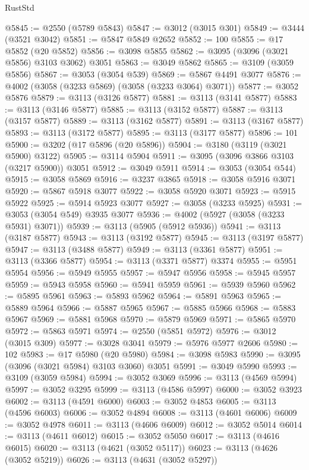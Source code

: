 \begin{lexlean}{RustStd}
\begin{coremodule}
@5845 := @2550 (@5789 @5843)
@5847 := @3012 (@3015 @301)
@5849 := @3444 (@3521 @3042)
@5851 := @5847 @5849 @2652
@5852 := 100
@5855 := @17 @5852 (@20 @5852)
@5856 := @3098 @5855
@5862 := @3095 (@3096 (@3021 @5856) @3103 @3062) @3051
@5863 := @3049 @5862
@5865 := @3109 (@3059 @5856)
@5867 := @3053 (@3054 @539)
@5869 := @5867 @4491 @3077
@5876 := @4002 (@3058 (@3233 @5869) (@3058 (@3233 @3064) @3071))
@5877 := @3052 @5876
@5879 := @3113 (@3126 @5877)
@5881 := @3113 (@3141 @5877)
@5883 := @3113 (@3146 @5877)
@5885 := @3113 (@3152 @5877)
@5887 := @3113 (@3157 @5877)
@5889 := @3113 (@3162 @5877)
@5891 := @3113 (@3167 @5877)
@5893 := @3113 (@3172 @5877)
@5895 := @3113 (@3177 @5877)
@5896 := 101
@5900 := @3202 (@17 @5896 (@20 @5896))
@5904 := @3180 (@3119 (@3021 @5900) @3122)
@5905 := @3114 @5904
@5911 := @3095 (@3096 @3866 @3103 (@3217 @5900)) @3051
@5912 := @3049 @5911
@5914 := @3053 (@3054 @544)
@5915 := @3058 @5869
@5916 := @3237 @3865
@5918 := @3058 @5916 @3071
@5920 := @5867 @5918 @3077
@5922 := @3058 @5920 @3071
@5923 := @5915 @5922
@5925 := @5914 @5923 @3077
@5927 := @3058 (@3233 @5925)
@5931 := @3053 (@3054 @549) @3935 @3077
@5936 := @4002 (@5927 (@3058 (@3233 @5931) @3071))
@5939 := @3113 (@5905 (@5912 @5936))
@5941 := @3113 (@3187 @5877)
@5943 := @3113 (@3192 @5877)
@5945 := @3113 (@3197 @5877)
@5947 := @3113 (@3488 @5877)
@5949 := @3113 (@3361 @5877)
@5951 := @3113 (@3366 @5877)
@5954 := @3113 (@3371 @5877) @3374
@5955 := @5951 @5954
@5956 := @5949 @5955
@5957 := @5947 @5956
@5958 := @5945 @5957
@5959 := @5943 @5958
@5960 := @5941 @5959
@5961 := @5939 @5960
@5962 := @5895 @5961
@5963 := @5893 @5962
@5964 := @5891 @5963
@5965 := @5889 @5964
@5966 := @5887 @5965
@5967 := @5885 @5966
@5968 := @5883 @5967
@5969 := @5881 @5968
@5970 := @5879 @5969
@5971 := @5865 @5970
@5972 := @5863 @5971
@5974 := @2550 (@5851 @5972)
@5976 := @3012 (@3015 @309)
@5977 := @3028 @3041
@5979 := @5976 @5977 @2606
@5980 := 102
@5983 := @17 @5980 (@20 @5980)
@5984 := @3098 @5983
@5990 := @3095 (@3096 (@3021 @5984) @3103 @3060) @3051
@5991 := @3049 @5990
@5993 := @3109 (@3059 @5984)
@5994 := @3052 @3069
@5996 := @3113 (@4569 @5994)
@5997 := @3052 @3295
@5999 := @3113 (@4586 @5997)
@6000 := @3052 @3923
@6002 := @3113 (@4591 @6000)
@6003 := @3052 @4853
@6005 := @3113 (@4596 @6003)
@6006 := @3052 @4894
@6008 := @3113 (@4601 @6006)
@6009 := @3052 @4978
@6011 := @3113 (@4606 @6009)
@6012 := @3052 @5014
@6014 := @3113 (@4611 @6012)
@6015 := @3052 @5050
@6017 := @3113 (@4616 @6015)
@6020 := @3113 (@4621 (@3052 @5117))
@6023 := @3113 (@4626 (@3052 @5219))
@6026 := @3113 (@4631 (@3052 @5297))

\end{coremodule}
\end{lexlean}
